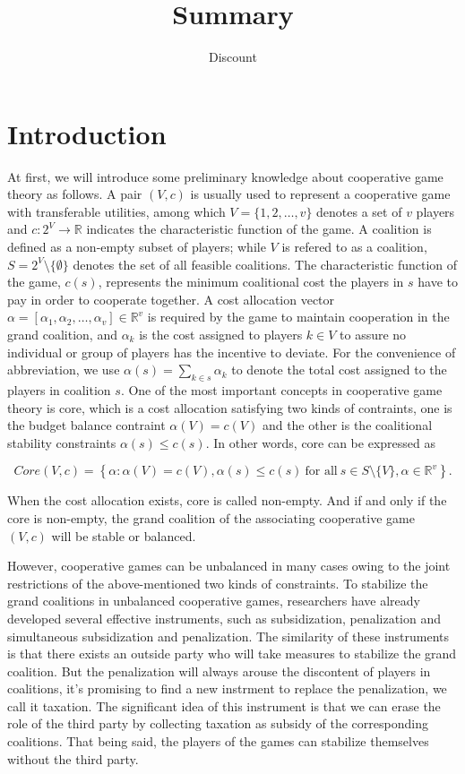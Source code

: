 \documentclass[UTF8]{article}
\title{Summary}
\author{Dis\cdot count}
\begin{document}
\maketitle{}

\section*{Introduction}
At first, we will introduce some preliminary knowledge about cooperative game theory as follows.
A pair $(V,c)$ is usually used to represent a cooperative game with transferable utilities, among which $V=\{1,2,\dots,v\}$ denotes a set of $v$ players and $c:2^{V}\to \mathbb{R}$ indicates the characteristic function of the game. A coalition is defined as a non-empty subset of players; while $V$ is refered to as a coalition, $S=2^{V} \setminus\{\emptyset\}$ denotes the set of all feasible coalitions. The characteristic function of the game, $c(s)$, represents the minimum coalitional cost the players in $s$ have to pay in order to cooperate together.
A cost allocation vector $\alpha=[\alpha_{1},\alpha_{2},\dots,\alpha_{v}] \in \mathbb{R}^{v}$ is required by the game to maintain cooperation in the grand coalition, and $\alpha_{k}$ is the cost assigned to players $k \in V$ to assure no individual or group of players has the incentive to deviate. For the convenience of abbreviation, we use $\alpha(s)=\sum_{k\in{s}}\alpha_{k}$ to denote the total cost assigned to the players in coalition $s$.
One of the most important concepts in cooperative game theory is core, which is a cost allocation satisfying two kinds of contraints, one is the budget balance contraint {$\alpha(V)=c(V)$} and the other is the coalitional stability constraints {$\alpha(s) \leq c(s)$}. In other words, core can be expressed as

\[
Core(V,c)= \left\{\alpha:\alpha(V)=c(V), \alpha(s)\leq c(s)\ \text{for all}\ s \in S \setminus\{V\}, \alpha \in \mathbb{R}^{v} \right\}.
\]

When the cost allocation exists, core is called non-empty. And if and only if the core is non-empty, the grand coalition of the associating cooperative game $(V,c)$ will be stable or balanced.

However, cooperative games can be unbalanced in many cases owing to the joint restrictions of the above-mentioned two kinds of constraints. To stabilize the grand coalitions in unbalanced cooperative games, researchers have already developed several effective instruments, such as subsidization, penalization and simultaneous subsidization and penalization. The
similarity of these instruments is that there exists an outside party who will take measures to stabilize the grand coalition. But the penalization will always arouse the discontent of players in coalitions, it's promising to find a new instrment to replace the penalization, we call it taxation.
The significant idea of this instrument is that we can erase the role of the third party by collecting taxation as subsidy of the corresponding coalitions.
That being said, the players of the games can stabilize themselves without the third party.
\end{document}
